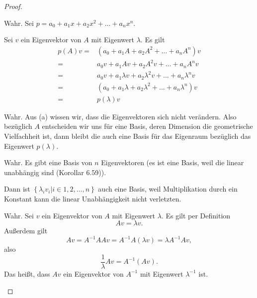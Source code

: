 \begin{proof}
	\begin{parts}
	\item Wahr. Sei $p=a_0+a_1x+a_2x^2+\dots + a_n x^n$. 

		Sei $v$ ein Eigenvektor von $A$ mit Eigenwert $\lambda$. Es gilt
		\begin{align*}
			p(A)v=& \left( a_0+a_1A+a_2 A^2+\dots+a_n A^n \right)v\\
			=&a_0v+a_1Av+a_2A^2v+\dots+a_n A^nv\\
			=&a_0v+a_1\lambda v+a_2\lambda^2 v+\dots+a_n\lambda^n v\\
			=&(a_0+a_1\lambda+a_2\lambda^2+\dots+a_n\lambda^n)v\\
			=&p(\lambda)v
		\end{align*}
	\item Wahr. Aus (a) wissen wir, dass die Eigenvektoren sich nicht verändern. Also bezüglich $A$ entscheiden wir uns f\"{u}r eine Basis, deren Dimension die geometrische Vielfachheit ist, dann bleibt die auch eine Basis f\"{u}r das Eigenraum bezüglich das Eigenwert $p(\lambda)$.
	\item Wahr. Es gibt eine Basis von $n$ Eigenvektoren (es ist eine Basis, weil die linear unabhängig sind (Korollar 6.59)). 

		Dann ist $\left\{ \lambda_i v_i|i\in 1,2,\dots,n \right\} $ auch eine Basis, weil Multiplikation durch ein Konstant kann die linear Unabhängigkeit nicht verletzten.
	\item Wahr. Sei $v$ ein Eigenvektor von $A$ mit Eigenwert $\lambda$. Es gilt per Definition
		\[
		Av=\lambda v
		.\] 
		Außerdem gilt
		\[
			Av=A^{-1}A Av=A^{-1}A(\lambda v)=\lambda A^{-1}Av
		,\] 
		also
		\[
			\frac{1}{\lambda}Av=A^{-1}(Av)
		.\] 
		Das heißt, dass $Av$ ein Eigenvektor von $A^{-1}$ mit Eigenwert $\lambda^{-1}$ ist.


\end{parts}
\end{proof}
